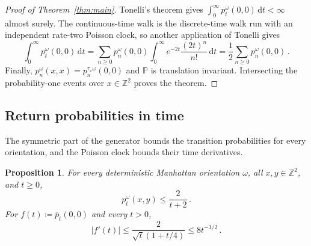 \documentclass[11pt]{amsart}
\theoremstyle{plain}
\newtheorem{proposition}[theorem]{Proposition}
\theoremstyle{definition}
\newcommand{\Z}{\mathbb Z}
\renewcommand{\P}{\mathbb P}
\newcommand{\1}{\mathbf 1}
\newcommand{\abs}[1]{\lvert #1\rvert}
\newcommand{\dd}{\,\mathrm d}
\begin{document}
\begin{proof}[Proof of Theorem~\ref{thm:main}]
Tonelli's theorem gives
$\int_0^\infty p_t^\omega(0,0)\dd t<\infty$ almost surely.
The continuous-time walk is the discrete-time walk run with an independent
rate-two Poisson clock, so another application of Tonelli gives
\[
  \int_0^\infty p_t^\omega(0,0)\dd t
  =\sum_{n\geq0}p_n^\omega(0,0)
    \int_0^\infty e^{-2t}\frac{(2t)^n}{n!}\dd t
  =\frac12\sum_{n\geq0}p_n^\omega(0,0)\, .
\]
Finally, $p_n^\omega(x,x)=p_n^{\tau_x\omega}(0,0)$ and $\P$ is
translation invariant.  Intersecting the probability-one events over
$x\in\Z^2$ proves the theorem.
\end{proof}

\subsection{Return probabilities in time}\label{ssec:time}

The symmetric part of the generator bounds the transition probabilities
for every orientation, and the Poisson clock bounds their time derivatives.

\begin{proposition}\label{prop:time}
For every deterministic Manhattan orientation $\omega$, all $x,y\in\Z^2$,
and $t\geq0$,
\begin{equation}\label{eq:heat-kernel}
  p_t^\omega(x,y)\leq\frac2{t+2}\, .
\end{equation}
For $f(t)\coloneqq\overline p_t(0,0)$ and every $t>0$,
\begin{equation}\label{eq:time-derivative}
  \abs{f'(t)}\leq\frac2{\sqrt t(1+t/4)}\leq8t^{-3/2}\, .
\end{equation}
\end{proposition}
\end{document}
